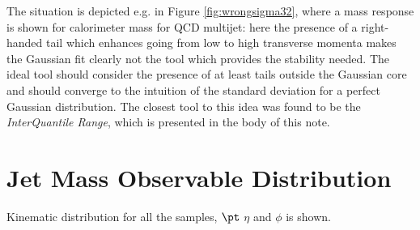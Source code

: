 The situation is depicted e.g. in Figure \ref{fig:wrongsigma32}, where a mass response is shown for calorimeter mass for QCD multijet: here the presence of a right-handed tail which enhances going from low to high transverse momenta makes the Gaussian fit clearly not the tool which provides the stability needed. The ideal tool should consider the presence of at least tails outside the Gaussian core and should converge to the intuition of the standard deviation for a perfect Gaussian distribution.
The closest tool to this idea was found to be the \textit{InterQuantile Range}, which is presented in the body of this note.


\chapter{Jet Mass Observable Distribution}
Kinematic distribution for all the samples, $\pt$ $\eta$ and $\phi$ is shown.

